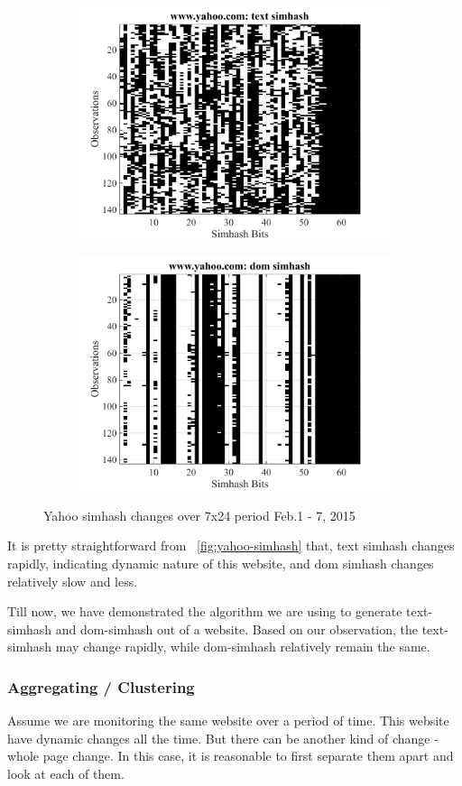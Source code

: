 \begin{figure}[t]
  \centering
  \begin{subfigure}
    \centering
    \includegraphics[width=.5\textwidth]{fig/yahoo-text-user}
    \label{fig:yahoo-text-user}
  \end{subfigure}%
  \begin{subfigure}
    \centering
    \includegraphics[width=.5\textwidth]{fig/yahoo-dom-user}
    \label{fig:yahoo-dom-user}
  \end{subfigure}
  \caption{Yahoo simhash changes over 7x24 period Feb.1 - 7, 2015}
  \label{fig:yahoo-simhash}
\end{figure}





It is pretty straightforward from ~\autoref{fig:yahoo-simhash} that,
text simhash changes rapidly, indicating dynamic nature of this
website, and dom simhash changes relatively slow and less.

Till now, we have demonstrated the algorithm we are using to generate
text-simhash and dom-simhash out of a website. Based on our observation, the
text-simhash may change rapidly, while dom-simhash relatively remain the same.


\subsubsection{Aggregating / Clustering}
Assume we are monitoring the same website over a period of time. This website
have dynamic changes all the time. But there can be another kind of change -
whole page change. In this case, it is reasonable to first separate them apart
and look at each of them.


